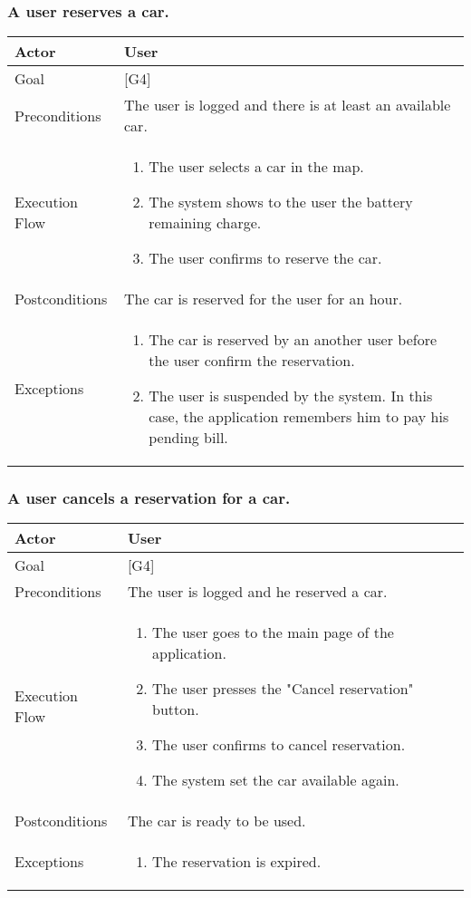 \documentclass[english]{article}
\begin{document}
	\subsubsection{A user reserves a car.}
	\begin{tabularx}{\textwidth}{  l  X  }
		\hline
		Actor & User\\
		\hline
		Goal & [G4]\\
		\hline
		Preconditions & The user is logged and there is at least an available car.\\
		\hline
		Execution Flow & \begin{enumerate}
			\item{The user selects a car in the map.}
			\item{The system shows to the user the battery remaining charge.}
			\item{The user confirms to reserve the car.}
		\end{enumerate}\\
		\hline
		Postconditions & The car is reserved for the user for an hour. \\
		\hline
		Exceptions & \begin{enumerate}
			\item{The car is reserved by an another user before the user confirm the reservation.}
			\item{The user is suspended by the system. In this case, the application remembers him to pay his pending bill.}
		\end{enumerate}\\
		\hline
	\end{tabularx}
	
	\subsubsection{A user cancels a reservation for a car.}
	\begin{tabularx}{\textwidth}{  l  X  }
		\hline
		Actor & User\\
		\hline
		Goal & [G4]\\
		\hline
		Preconditions & The user is logged and he reserved a car.\\
		\hline
		Execution Flow & \begin{enumerate}
			\item{The user goes to the main page of the application.}
			\item{The user presses the "Cancel reservation" button.}
			\item{The user confirms to cancel reservation.}
			\item{The system set the car available again.}
		\end{enumerate}\\
		\hline
		Postconditions & The car is ready to be used. \\
		\hline
		Exceptions & \begin{enumerate}
			\item{The reservation is expired.}
		\end{enumerate}\\
		\hline
	\end{tabularx}
	
\end{document}
